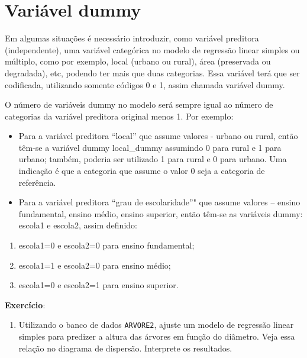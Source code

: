 \documentclass[12pt,brazil,oneside]{book}
\providecommand{\tightlist}{%
  \setlength{\itemsep}{0pt}\setlength{\parskip}{0pt}}
\begin{document}
\hypertarget{variavel-dummy}{%
\section{Variável dummy}\label{variavel-dummy}}

Em algumas situações é necessário introduzir, como variável preditora (independente), uma variável categórica no
modelo de regressão linear simples ou múltiplo, como por exemplo, local (urbano ou rural), área (preservada ou degradada), etc, podendo ter mais que duas categorias. Essa variável terá que ser codificada, utilizando somente códigos 0 e 1, assim chamada variável dummy.

O número de variáveis dummy no modelo será sempre igual ao número de categorias da variável preditora original
menos 1. Por exemplo:

\begin{itemize}
\item
  Para a variável preditora ``local'' que assume valores - urbano ou rural, então têm-se a variável dummy
  local\_dummy assumindo 0 para rural e 1 para urbano; também, poderia ser utilizado 1 para rural e 0 para
  urbano. Uma indicação é que a categoria que assume o valor 0 seja a categoria de referência.
\item
  Para a variável preditora ``grau de escolaridade''" que assume valores -- ensino fundamental, ensino médio,
  ensino superior, então têm-se as variáveis dummy: escola1 e escola2, assim definido:
\end{itemize}

\begin{enumerate}
\def\labelenumi{\alph{enumi}.}
\tightlist
\item
  escola1=0 e escola2=0 para ensino fundamental;
\item
  escola1=1 e escola2=0 para ensino médio;
\item
  escola1=0 e escola2=1 para ensino superior.
\end{enumerate}

\textbf{Exercício}:

\begin{enumerate}
\def\labelenumi{\arabic{enumi})}
\tightlist
\item
  Utilizando o banco de dados \texttt{ARVORE2}, ajuste um modelo de regressão linear simples para predizer a altura das árvores
  em função do diâmetro. Veja essa relação no diagrama de dispersão. Interprete os resultados.
\end{enumerate}
\end{document}
